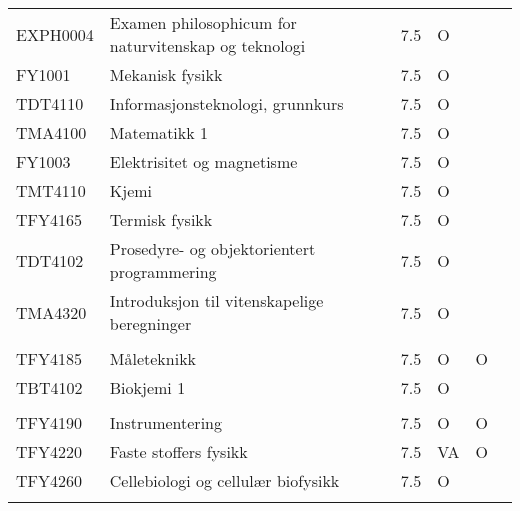 \documentclass{article}
\begin{document}
\begin{table}
  \scriptsize
  \begin{tabular}{llllll}
    EXPH0004 & Examen philosophicum for naturvitenskap og teknologi               & 7.5 & O  &    &    \\
    FY1001   & Mekanisk   fysikk                                                  & 7.5 & O  &    &    \\
    TDT4110  & Informasjonsteknologi,   grunnkurs                                 & 7.5 & O  &    &    \\
    TMA4100  & Matematikk 1                                                       & 7.5 & O  &    &    \\
    FY1003   & Elektrisitet   og magnetisme                                       & 7.5 & O  &    &    \\
    TMT4110  & Kjemi                                                              & 7.5 & O  &    &    \\
    TFY4165  & Termisk   fysikk                                                   & 7.5 & O  &    &    \\
    TDT4102  & Prosedyre-   og objektorientert programmering                      & 7.5 & O  &    &    \\
    TMA4320  & Introduksjon   til vitenskapelige beregninger                      & 7.5 & O  &    &    \\
             &                                                                    &     &    &    &    \\
    TFY4185  & Måleteknikk                                                        & 7.5 & O  & O  &    \\
    TBT4102  & Biokjemi 1                                                         & 7.5 & O  &    &    \\
             &                                                                    &     &    &    &    \\
    TFY4190  & Instrumentering                                                    & 7.5 & O  & O  &    \\
    TFY4220  & Faste   stoffers fysikk                                            & 7.5 & VA & O  &    \\
    TFY4260  & Cellebiologi   og cellulær biofysikk                               & 7.5 & O  &    &    \\
             &                                                                    &     &    &    &    \\

\end{tabular}
\end{table}
\end{document}
